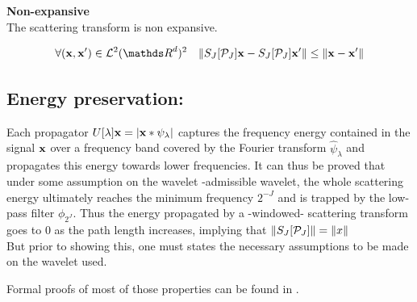 \documentclass[a4paper,11pt]{report}
\begin{document}
			\begin{prop} \textbf{Non-expansive}\\ 
				The scattering transform is non expansive.
				
				\begin{equation}
				  \forall (\bfx,\bfx') \in \mcalL^{2}(\dsR^{d})^{2} \;\;\; \norm{S_{J}[\mcalP_{J}]\bfx - S_{J}[\mcalP_{J}]\bfx'} \leq \norm{\bfx-\bfx'}
				\end{equation}

			  \label{pty:Nonexpansivity}
			\end{prop}

		\subsection{Energy preservation:}
			\label{subsec:ST/Pties/Energy}
			
			Each propagator $U[\lambda]{\bf x} = \left| {\bf x} \ast \psi_{\lambda} \right|$ captures the frequency energy contained in the signal ${\bf x}$ over a frequency band covered by the Fourier transform $\hat{\psi}_{\lambda}$ and propagates this energy towards lower frequencies. It can thus be proved that under some assumption on the wavelet -admissible wavelet, the whole scattering energy ultimately reaches the minimum frequency $2^{-J}$ and is trapped by the low-pass filter $\phi_{2^{J}}$. Thus the energy propagated by a -windowed- scattering transform goes to $0$ as the path length increases, implying that $\left\lVert S_{J}[\mathcal{P}_{J}] \right\rVert = \left\lVert x \right\rVert$\\
			
			But prior to showing this, one must states the necessary assumptions to be made on the wavelet used.
			
			\begin{note}
			  Formal proofs of most of those properties can be found in \cite{mallat2012gis}.
			\end{note}
			
\end{document}
